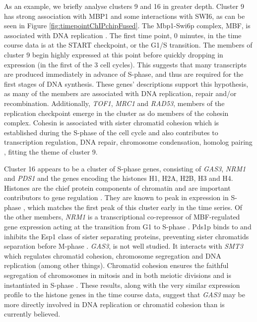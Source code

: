 \documentclass{bmcart}
\begin{document}
As an example, we briefly analyse clusters 9 and 16 in greater depth. Cluster 9 has strong association with MBP1 and some interactions with SWI6, as can be seen in Figure \ref{fig:timepointChIPchipFused}. The Mbp1-Swi6p complex, MBF, is associated with DNA replication \citep{iyer2001genomic}. The first time point, 0 minutes, in the time course data is at the START checkpoint, or the G1/S transition. The members of cluster 9 begin highly expressed at this point before quickly dropping in expression (in the first of the 3 cell cycles). This suggests that many transcripts are produced immediately in advance of S-phase, and thus are required for the first stages of DNA synthesis. 
These genes' descriptions \citep[found using \texttt{org.Sc.sgd.db},][and shown in Table 3 of the Supplementary Material]{carlson2014org} support this hypothesis, as many of the members are associated with DNA replication, repair and/or recombination. Additionally, \emph{TOF1}, \emph{MRC1} and \emph{RAD53}, members of the replication checkpoint \citep{bando2009csm3, lao2018yeast} emerge in the cluster as do members of the cohesin complex. Cohesin is associated with sister chromatid cohesion which is established during the S-phase of the cell cycle \citep{toth1999yeast} and also contributes to transcription regulation, DNA repair, chromosome condensation, homolog pairing \citep{mehta2013cohesin}, fitting the theme of cluster 9.

Cluster 16 appears to be a cluster of S-phase genes, consisting of \emph{GAS3}, \emph{NRM1} and \emph{PDS1} and the genes encoding the histones H1, H2A, H2B, H3 and H4. Histones are the chief protein components of chromatin \citep{fischle2003histone} and are important contributors to gene regulation \citep{bannister2011regulation}. They are known to peak in expression in S-phase \citep{granovskaia2010high}, which matches the first peak of this cluster early in the time series. Of the other members, \emph{NRM1} is a transcriptional co-repressor of MBF-regulated gene expression acting at the transition from G1 to S-phase \citep{de2006constraining, aligianni2009fission}. Pds1p binds to and inhibits the Esp1 class of sister separating proteins, preventing sister chromatids separation before M-phase \citep{ciosk1998esp1, toth1999yeast}. \emph{GAS3}, is not well studied. It interacts with \emph{SMT3} which regulates chromatid cohesion, chromosome segregation and DNA replication (among other things). Chromatid cohesion ensures the faithful segregation of chromosomes in mitosis and in both meiotic divisions \citep{cooper2009pds1p} and is instantiated in S-phase \citep{toth1999yeast}. These results, along with the very similar expression profile to the histone genes in the time course data, suggest that \emph{GAS3} may be more directly involved in DNA replication or chromatid cohesion than is currently believed.
\end{document}
